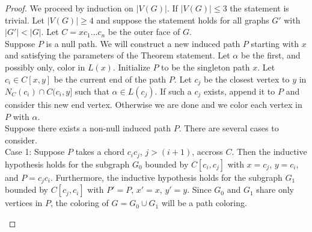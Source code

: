 \documentclass[11pt,letter]{article}
\begin{document}
\begin{proof}
We proceed by induction on $|V(G)|$. If $|V(G)|\le3$ the statement is trivial. Let $|V(G)|\ge4$ and suppose the
statement holds for all graphs $G'$ with $|G'|<|G|$. Let $C=xc_1\ldots c_{n}$ be the outer face of $G$.\\

\noindent Suppose $P$ is a null path. We will construct a new induced path $P$ starting with $x$ and
satisfying the parameters of the Theorem statement. Let $\alpha$ be
the first, and possibly only, color in $L(x)$.
Initialize $P$ to be the singleton path $x$. Let $c_i\in C[x,y]$ be the current end of the path $P$.
Let $c_j$ be the closest vertex to $y$ in $N_C(c_i)\cap C(c_i,y]$ such that $\alpha\in L(c_j)$. If such a
$c_j$ exists, append it to $P$ and consider this new end vertex. Otherwise we are done and we color each
vertex in $P$ with $\alpha$.\\

\noindent Suppose there exists a non-null induced path $P$. There are several cases to consider.\\

\noindent Case 1: Suppose $P$ takes a chord $c_ic_j$,
$j>(i+1)$, accross $C$. Then the inductive hypothesis holds for the subgraph $G_0$
bounded by $C[c_i,c_j]$ with $x=c_j$, $y=c_i$, and $P=c_jc_i$. Furthermore, the inductive hypothesis
holds for the subgraph $G_1$ bounded by $C[c_j,c_i]$ with $P'=P$, $x'=x$, $y'=y$. Since $G_0$ and $G_1$
share only vertices in $P$, the coloring of $G=G_0\cup G_1$ will be a path coloring.\\

\begin{adjustwidth}{2em}{2em}
\begin{center}
\end{center}
\end{adjustwidth}
\end{proof}
\end{document}
